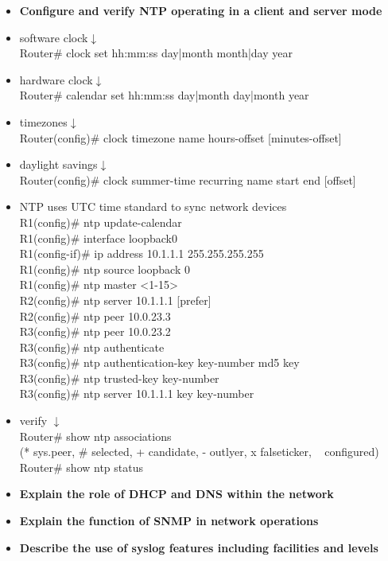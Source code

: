 \documentclass{article}
\begin{document}
\begin{itemize}
  \item \textbf{Configure and verify NTP operating in a client and server mode}
  	\item[] software clock$\downarrow$\\
		Router\# clock set hh:mm:ss {day|month} {month|day} year
	\item[] hardware clock$\downarrow$\\
		Router\# calendar set hh:mm:ss {day|month} {day|month} year
	\item[] timezones$\downarrow$\\
		Router(config)\# clock timezone name hours-offset [minutes-offset]
	\item[] daylight savings$\downarrow$\\
		Router(config)\# clock summer-time recurring name start end [offset]
	\item[] NTP uses UTC time standard to sync network devices\\
		R1(config)\# ntp update-calendar\\
		R1(config)\# interface loopback0\\
		R1(config-if)\# ip address 10.1.1.1 255.255.255.255\\
		R1(config)\# ntp source loopback 0\\
		R1(config)\# ntp master \textless 1-15\textgreater\\
		R2(config)\# ntp server 10.1.1.1 [prefer]\\
		R2(config)\# ntp peer 10.0.23.3\\
		R3(config)\# ntp peer 10.0.23.2\\
		R3(config)\# ntp authenticate\\
		R3(config)\# ntp authentication-key key-number md5 key\\
		R3(config)\# ntp trusted-key key-number\\
		R3(config)\# ntp server 10.1.1.1 key key-number
	\item[] verify $\downarrow$\\
		Router\# show ntp associations\\
		(* sys.peer, \# selected, + candidate, - outlyer, x falseticker, ~ configured)\\
		Router\# show ntp status
  \item \textbf{Explain the role of DHCP and DNS within the network}
  \item \textbf{Explain the function of SNMP in network operations}
  \item \textbf{Describe the use of syslog features including facilities and levels}

\end{itemize}
\end{document}
